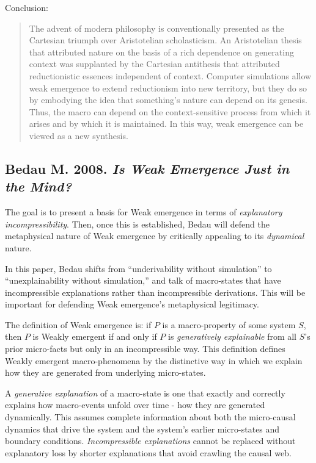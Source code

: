 \documentclass{article}
\newcommand{\ti}[1]{\textit{#1}}
\newcommand{\annbibtitle}[2]{\subsection*{#1. \ti{#2}}}
\begin{document}
Conclusion:
\begin{quote}
The advent of modern philosophy is conventionally presented as the Cartesian triumph over Aristotelian scholasticism. An Aristotelian thesis that attributed nature on the basis of a rich dependence on generating context was supplanted by the Cartesian antithesis that attributed reductionistic essences independent of context. Computer simulations allow weak emergence to extend reductionism into new territory, but they do so by embodying the idea that something's nature can depend on its genesis. Thus, the macro can depend on the context-sensitive process from which it arises and by which it is maintained. In this way, weak emergence can be viewed as a new synthesis.
\end{quote}

\annbibtitle{Bedau M. 2008}{Is Weak Emergence Just in the Mind?}

The goal is to present a basis for Weak emergence in terms of \ti{explanatory incompressibility}. Then, once this is established, Bedau will defend the metaphysical nature of Weak emergence by critically appealing to its \ti{dynamical} nature.

In this paper, Bedau shifts from ``underivability without simulation'' to ``unexplainability without simulation,'' and talk of macro-states that have incompressible explanations rather than incompressible derivations. This will be important for defending Weak emergence's metaphysical legitimacy.

The definition of Weak emergence is: if $P$ is a macro-property of some system $S$, then $P$ is Weakly emergent if and only if $P$ is \ti{generatively explainable} from all $S$'s prior micro-facts but only in an incompressible way. This definition defines Weakly emergent macro-phenomena by the distinctive way in which we explain how they are generated from underlying micro-states.

A \ti{generative explanation} of a macro-state is one that exactly and correctly explains how macro-events unfold over time - how they are generated dynamically. This assumes complete information about both the micro-causal dynamics that drive the system and the system's earlier micro-states and boundary conditions. \ti{Incompressible explanations} cannot be replaced without explanatory loss by shorter explanations that avoid crawling the causal web.
\end{document}

